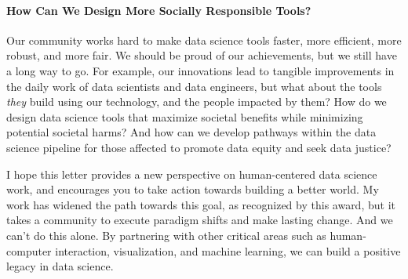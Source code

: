 \documentclass[10pt]{article}
\begin{document}
\paragraph{How Can We Design More Socially Responsible Tools?}
Our community works hard to make data science tools faster, more efficient, more robust, and more fair. We should be proud of our achievements, but we still have a long way to go. For example, our innovations lead to tangible improvements in the daily work of data scientists and data engineers, but what about the tools \emph{they} build using our technology, and the people impacted by them? How do we design data science tools that maximize societal benefits while minimizing potential societal harms? And how can we develop pathways within the data science pipeline for those affected to promote data equity and seek data justice?

I hope this letter provides a new perspective on human-centered data science work, and encourages you to take action towards building a better world. My work has widened the path towards this goal, as recognized by this award, but it takes a community to execute paradigm shifts and make lasting change. And we can't do this alone. By partnering with other critical areas such as human-computer interaction, visualization, and machine learning, we can build a positive legacy in data science.





\end{document}
